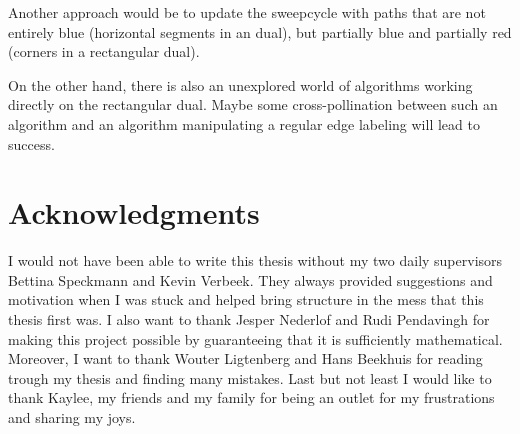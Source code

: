 Another approach would be to update the sweepcycle with paths that are not entirely blue (horizontal segments in an dual), but partially blue and partially red (corners in a rectangular dual).

On the other hand, there is also an unexplored world of algorithms working directly on the rectangular dual. Maybe some cross-pollination between such an algorithm and an algorithm manipulating a regular edge labeling will lead to success.

\newpage
\thispagestyle{plain}
\section*{Acknowledgments}
I would not have been able to write this thesis without my two daily supervisors Bettina Speckmann and Kevin Verbeek. They always provided suggestions and motivation when I was stuck and helped bring structure in the mess that this thesis first was. I also want to thank Jesper Nederlof and
Rudi Pendavingh for making this project possible by guaranteeing that it is sufficiently mathematical.
Moreover, I want to thank Wouter Ligtenberg and Hans Beekhuis for reading trough my thesis and finding many mistakes. Last but not least I would like to thank Kaylee, my friends and my family for being an outlet for my frustrations and sharing my joys.
